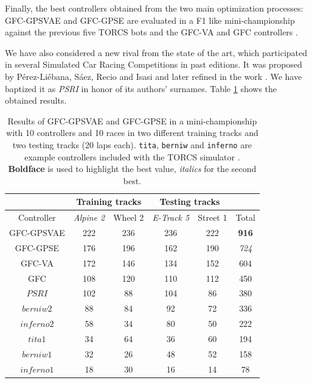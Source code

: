\documentclass[10pt,journal,compsoc]{IEEEtran}
\begin{document}
Finally, the best controllers obtained from the two main optimization
processes: {\sf GFC-GPSVAE} and {\sf GFC-GPSE} are evaluated in a F1 like
mini-championship against the previous five TORCS bots and the {\sf GFC-VA}\cite{DBLP:conf/cig/SalemMG19} and {\sf GFC} controllers  \cite{salem_cig2018}. 

We have also considered a new rival from the state of the art, which participated in several Simulated Car Racing Competitions in past editions. 
It was proposed by P{\'e}rez-Li{\'e}bana, S{\'a}ez, Recio and Isasi
\cite{EvolvingRuleSystem08} and later refined in the work
\cite{PerezEvolvingFuzzy09}. We have baptized it as \textit{PSRI} in honor of
its authors' surnames. 
Table \ref{tab:allsresults} shows the obtained results.
%
\begin{table}[ht]
  \centering
  {\scriptsize
    \caption{ Results of {\sf GFC-GPSVAE} and {\sf GFC-GPSE}
      in a mini-championship with 10 controllers
      and 10 races in two different training tracks and two testing tracks (20 laps each). {\tt tita}, {\tt berniw} and {\tt inferno} are example controllers included with the TORCS
      simulator \cite{torcs4}.  {\bf Boldface} is used to highlight the best value, {\em italics} for the second best.}
    {
            \begin{tabular}{|c|c|c|c|c||c|}
	\hline
	& \multicolumn{2}{|c|}{Training tracks} &\multicolumn{2}{|c|}{Testing tracks} \\
	\hline
	Controller&\textit{Alpine 2} &Wheel 2&\textit{E-Track 5}  &Street 1&Total\\
        \hline
        \hline



{\sf GFC-GPSVAE}	&222&	236&	236&	222&	 {\bf 916}\\
{\sf GFC-GPSE}	&176&	196&	162&	190&	{\em 724}\\

{\sf GFC-VA} \cite{DBLP:conf/cig/SalemMG19}&172&	146&	134&	152& 	604\\
{\sf GFC}  \cite{salem_cig2018}	&108&	120&	110&	112&	450\\
$PSRI$\cite{PerezEvolvingFuzzy09}&102&	88 &	104&	86 &    380\\
$berniw2$		&88	&	84 &	92 &	72 &	336\\
$inferno2$	&58	&	34 &	80 &	50 &	222\\
$tita1$		&34 &	64 &	36 &	60 &	194\\
$berniw1$		&32	&	26 &	48 &	52 &	158\\
$inferno1$	&18	&	30 &	16 &	14 &	78\\
\hline

\end{tabular}
}\label{tab:allsresults}
}
\end{table}
\end{document}
